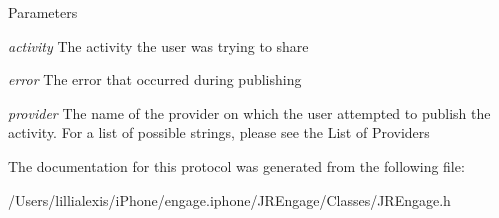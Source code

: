 \begin{DoxyParams}{Parameters}
\item[{\em activity}]The activity the user was trying to share\item[{\em error}]The error that occurred during publishing\item[{\em provider}]The name of the provider on which the user attempted to publish the activity. For a list of possible strings, please see the List of Providers \end{DoxyParams}


The documentation for this protocol was generated from the following file:\begin{DoxyCompactItemize}
\item 
/Users/lillialexis/iPhone/engage.iphone/JREngage/Classes/JREngage.h\end{DoxyCompactItemize}
